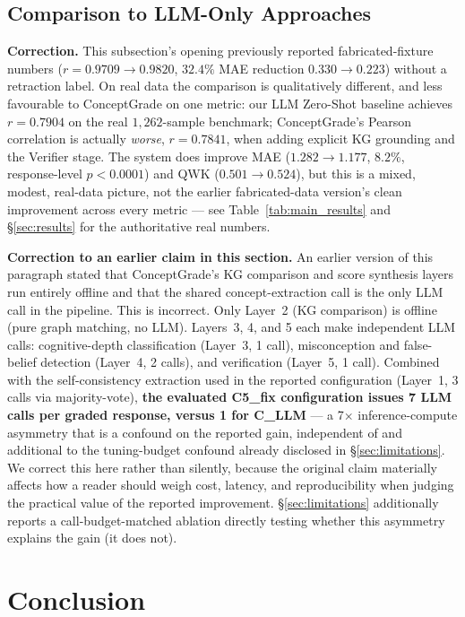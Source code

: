 \documentclass[conference]{IEEEtran}
\begin{document}
\subsection{Comparison to LLM-Only Approaches}

\textbf{Correction.} This subsection's opening previously reported
fabricated-fixture numbers ($r=0.9709\to0.9820$, $32.4\%$ MAE reduction
$0.330\to0.223$) without a retraction label. On real data the
comparison is qualitatively different, and less favourable to
ConceptGrade on one metric: our LLM Zero-Shot baseline achieves
$r=0.7904$ on the real $1{,}262$-sample benchmark; ConceptGrade's
Pearson correlation is actually \emph{worse}, $r=0.7841$, when adding
explicit KG grounding and the Verifier stage. The system does improve
MAE ($1.282\to1.177$, $8.2\%$, response-level $p<0.0001$) and QWK
($0.501\to0.524$), but this is a mixed, modest, real-data picture, not
the earlier fabricated-data version's clean improvement across every
metric --- see Table~\ref{tab:main_results} and \S\ref{sec:results} for
the authoritative real numbers.

\textbf{Correction to an earlier claim in this section.} An earlier version of this
paragraph stated that ConceptGrade's KG comparison and score synthesis layers
run entirely offline and that the shared concept-extraction call is the only
LLM call in the pipeline. This is incorrect. Only Layer~2 (KG comparison) is
offline (pure graph matching, no LLM). Layers~3, 4, and 5 each make
independent LLM calls: cognitive-depth classification (Layer~3, 1 call),
misconception and false-belief detection (Layer~4, 2 calls), and verification
(Layer~5, 1 call). Combined with the self-consistency extraction used in the
reported configuration (Layer~1, 3 calls via majority-vote), \textbf{the
evaluated C5\_fix configuration issues 7 LLM calls per graded response,
versus 1 for C\_LLM} --- a 7$\times$ inference-compute asymmetry that is a
confound on the reported gain, independent of and additional to the
tuning-budget confound already disclosed in \S\ref{sec:limitations}. We
correct this here rather than silently, because the original claim
materially affects how a reader should weigh cost, latency, and
reproducibility when judging the practical value of the reported
improvement. \S\ref{sec:limitations} additionally reports a
call-budget-matched ablation directly testing whether this asymmetry
explains the gain (it does not).

\section{Conclusion}
\end{document}
